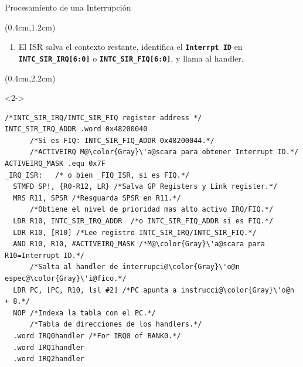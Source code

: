\documentclass[usenames,table,xcolor={x11names},aspectratio=169]{beamer}
\newcounter{saveenumi}
\newcommand{\seti}{\setcounter{saveenumi}{\value{enumi}}}
\newcommand{\conti}{\setcounter{enumi}{\value{saveenumi}}}
\begin{document}
\begin{frame}[t,fragile]{Procesamiento de una Interrupción}
 \begin{textblock*}{\textwidth}(0.4cm,1.2cm)
  \begin{enumerate}[<+->]\justifying 
    \conti
   \item El ISR salva el contexto restante, identifica el \texttt{\textbf{Interrpt ID}} en \texttt{\textbf{INTC\_SIR\_IRQ[6:0]}} o \texttt{\textbf{INTC\_SIR\_FIQ[6:0]}}, y llama al handler.
    \seti
  \end{enumerate}
 \end{textblock*}
 \begin{textblock*}{\textwidth}(0.4cm,2.2cm)
  \begin{onlyenv}<2->
   \begin{lstlisting}[basicstyle=\scriptsize,escapechar=\@,numbers=none, frame=single, xleftmargin=20pt, xrightmargin=0pt,]
      /*INTC_SIR_IRQ/INTC_SIR_FIQ register address */
INTC_SIR_IRQ_ADDR .word 0x48200040 
      /*Si es FIQ: INTC_SIR_FIQ_ADDR 0x48200044.*/
      /*ACTIVEIRQ M@\color{Gray}\'a@scara para obtener Interrupt ID.*/
ACTIVEIRQ_MASK .equ 0x7F
_IRQ_ISR:   /* o bien _FIQ_ISR, si es FIQ.*/
  STMFD SP!, {R0-R12, LR} /*Salva GP Registers y Link register.*/
  MRS R11, SPSR /*Resguarda SPSR en R11.*/
      /*Obtiene el nivel de prioridad mas alto activo IRQ/FIQ.*/
  LDR R10, INTC_SIR_IRQ_ADDR  /*o INTC_SIR_FIQ_ADDR si es FIQ.*/
  LDR R10, [R10] /*Lee registro INTC_SIR_IRQ/INTC_SIR_FIQ.*/
  AND R10, R10, #ACTIVEIRQ_MASK /*M@\color{Gray}\'a@scara para R10=Interrupt ID.*/
      /*Salta al handler de interrupci@\color{Gray}\'o@n espec@\color{Gray}\'i@fico.*/
  LDR PC, [PC, R10, lsl #2] /*PC apunta a instrucci@\color{Gray}\'o@n + 8.*/
  NOP /*Indexa la tabla con el PC.*/
      /*Tabla de direcciones de los handlers.*/
  .word IRQ0handler /*For IRQ0 of BANK0.*/
  .word IRQ1handler
  .word IRQ2handler
   \end{lstlisting}
  \end{onlyenv}
 \end{textblock*}
\end{frame}
\end{document}
